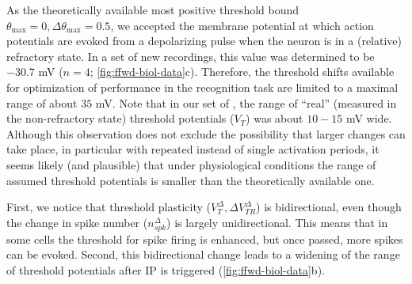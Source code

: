 As the theoretically available most positive threshold bound
        $\theta_{\mathrm{max}} = 0, \Delta \theta_{\mathrm{max}} = 0.5$,
        we accepted the membrane potential at which action potentials are evoked
            from a depolarizing pulse when the neuron is in a (relative) refractory state.
    In a set of new recordings, this value was determined to be $-30.7$ mV
        ($n=4$; \autoref{fig:ffwd-biol-data}c).
    Therefore, the threshold shifts available for optimization of performance in the recognition task
        are limited to a maximal range of about $35$ mV.
    Note that in our set of
        ,
        the range of ``real'' (measured in the non-refractory state) threshold potentials ($V_T$) was about $10-15$ mV wide.
    Although this observation does not exclude the possibility that larger changes can take place,
        in particular with repeated instead of single activation periods,
        it seems likely (and plausible) that under physiological conditions
            the range of assumed threshold potentials
            is smaller than the theoretically available one.

    First, we notice that threshold plasticity ($V_T^{\Delta}, \Delta V_{TR}^{\Delta}$) is bidirectional,
        even though the change in spike number ($n_{spk}^{\Delta}$) is largely unidirectional.
    This means that in some cells the threshold for spike firing is enhanced,
        but once passed, more spikes can be evoked.
    Second, this bidirectional change leads to a widening of the range of threshold potentials
        after IP is triggered (\autoref{fig:ffwd-biol-data}b).

